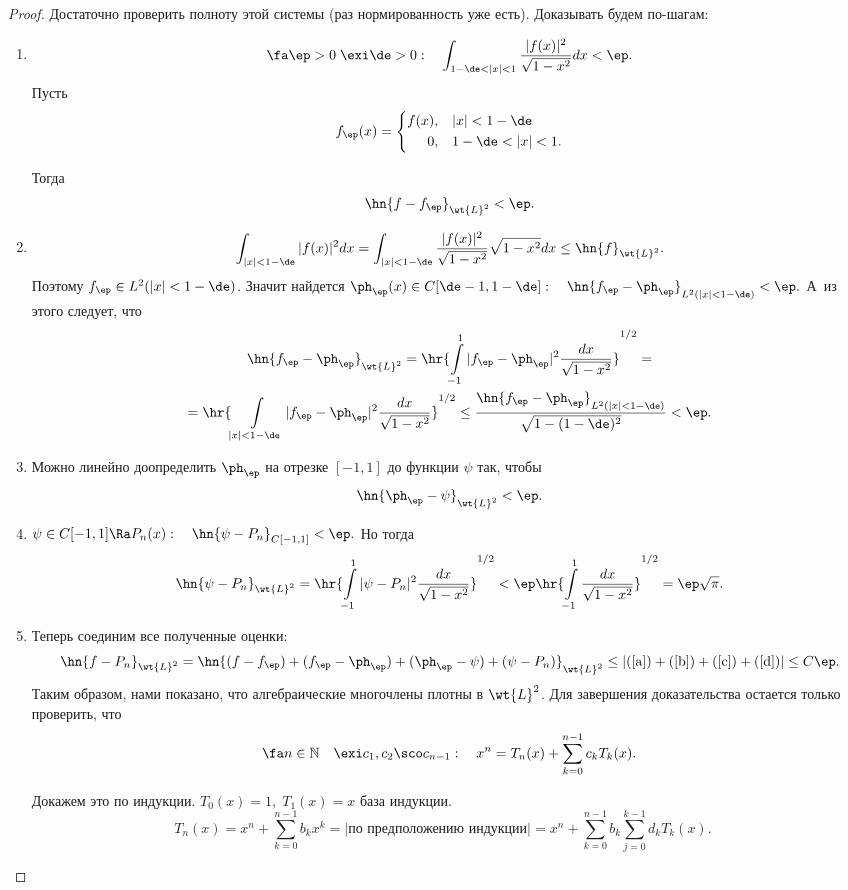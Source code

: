 \documentclass{article}
\begin{document}
\begin{proof}
  Достаточно проверить полноту этой системы
  (раз нормированность уже есть). Доказывать будем по-шагам:
  \begin{enumerate}
  \item
    $$\fa\ep>0\;\exi\de>0:\quad\int_{1-\de<|x|<1}\frac{|f(x)|^2}{\sqrt{1-x^2}}dx<\ep.$$
    Пусть
    $$f_{\ep}(x)=\left\{\begin{aligned}f(x),&\quad|x|<1-\de\\
    0,&\quad1-\de<|x|<1.\end{aligned}\right.$$

    Тогда
    \begin{equation}\label{a}
      \hn{f-f_{\ep}}_{\wt{L}^2}<\ep.
    \end{equation}
  \item
    $$\int_{|x|<1-\de}|f(x)|^2dx=\int_{|x|<1-\de}\frac{|f(x)|^2}{\sqrt{1-x^2}}\sqrt{1-x^2}dx\le\hn{f}_{\wt{L}^2}.$$
    Поэтому $f_{\ep}\in L^2(|x|<1-\de)$. Значит найдется $\ph_{\ep}(x)\in
    C[\de-1,1-\de]:\quad\hn{f_{\ep}-\ph_{\ep}}_{L^2(|x|<1-\de)}<\ep.$ А~из этого
    следует, что
    \begin{multline}\label{b}
      \hn{f_{\ep}-\ph_{\ep}}_{\wt{L}^2}=\hr{\int\limits_{-1}^1|f_{\ep}-\ph_{\ep}|^2\frac{dx}{\sqrt{1-x^2}}}^{1/2}=\\
      =\hr{\int\limits_{|x|<1-\de}|f_{\ep}-\ph_{\ep}|^2\frac{dx}{\sqrt{1-x^2}}}^{1/2}\le\frac{\hn{f_{\ep}-\ph_{\ep}}_{L^2(|x|<1-\de)}}{\sqrt{1-(1-\de)^2}}<\ep.
    \end{multline}

  \item
    Можно линейно доопределить $\ph_{\ep}$ на отрезке
    $[-1,1]$ до функции $\psi$ так, чтобы
    \begin{equation}\label{c}
      \hn{\ph_{\ep}-\psi}_{\wt{L}^2}<\ep.
    \end{equation}
  \item
    $\psi\in C[-1,1]\Ra P_n(x):\quad
    \hn{\psi-P_n}_{C[-1,1]}<\ep.$ Но тогда
    \begin{equation}\label{d}
      \hn{\psi-P_n}_{\wt{L}^2}=\hr{\int\limits_{-1}^1|\psi-P_n|^2\frac{dx}{\sqrt{1-x^2}}}^{1/2}<\ep\hr{\int\limits_{-1}^1\frac{dx}{\sqrt{1-x^2}}}^{1/2}=\ep\sqrt{\pi}.
    \end{equation}
  \item
    Теперь соединим все полученные оценки:
    $$\hn{f-P_n}_{\wt{L}^2}=\hn{(f-f_{\ep})+(f_{\ep}-\ph_{\ep})+(\ph_{\ep}-\psi)+(\psi-P_n)}_{\wt{L}^2}\le|(\ref{a})+(\ref{b})+(\ref{c})+(\ref{d})|\le C\ep.$$
    Таким образом, нами показано, что алгебраические многочлены плотны
    в $\wt{L}^2$. Для завершения доказательства остается только
    проверить, что
    $$\fa n\in\mathbb{N}\quad\exi
    c_1,c_2\sco c_{n-1}:\quad
    x^n=T_n(x)+\sum_{k=0}^{n-1}c_kT_k(x).$$

    Докажем это по индукции. $T_0(x)=1,\;T_1(x)=x$ база индукции.
    $$T_n(x)=x^n+\sum_{k=0}^{n-1}b_kx^k=|\text{по предположению индукции}|=x^n+\sum_{k=0}^{n-1}b_k\sum_{j=0}^{k-1}d_kT_k(x).\quad$$

  \end{enumerate}
\end{proof}
\end{document}
